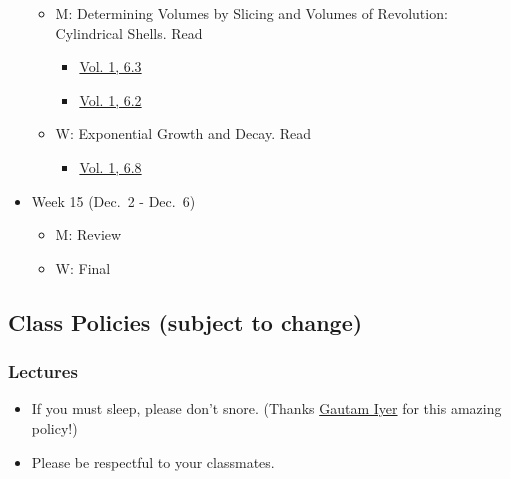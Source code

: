 \documentclass[
]{article}
\providecommand{\tightlist}{%
  \setlength{\itemsep}{0pt}\setlength{\parskip}{0pt}}
\begin{document}
\begin{itemize}
  \begin{itemize}
  \tightlist
  \item
    M: Determining Volumes by Slicing and Volumes of Revolution: Cylindrical Shells. Read

    \begin{itemize}
    \tightlist
    \item
      \href{https://openstax.org/books/calculus-volume-1/pages/6-3-volumes-of-revolution-cylindrical-shells}{Vol. 1, 6.3}
    \item
      \href{https://openstax.org/books/calculus-volume-1/pages/6-2-determining-volumes-by-slicing}{Vol. 1, 6.2}
    \end{itemize}
  \item
    W: Exponential Growth and Decay. Read

    \begin{itemize}
    \tightlist
    \item
      \href{https://openstax.org/books/calculus-volume-1/pages/6-8-exponential-growth-and-decay}{Vol. 1, 6.8}
    \end{itemize}
  \end{itemize}
\item
  Week 15 (Dec.~2 - Dec.~6)

  \begin{itemize}
  \tightlist
  \item
    M: Review
  \item
    W: Final
  \end{itemize}
\end{itemize}

\subsection*{Class Policies (subject to change)}\label{class-policies-subject-to-change}

\subsubsection*{Lectures}\label{lectures}

\begin{itemize}
\tightlist
\item
  If you must sleep, please don't snore. (Thanks \href{https://www.math.cmu.edu/~gautam/}{Gautam Iyer} for this amazing policy!)
\item
  Please be respectful to your classmates.
\end{itemize}
\end{document}
